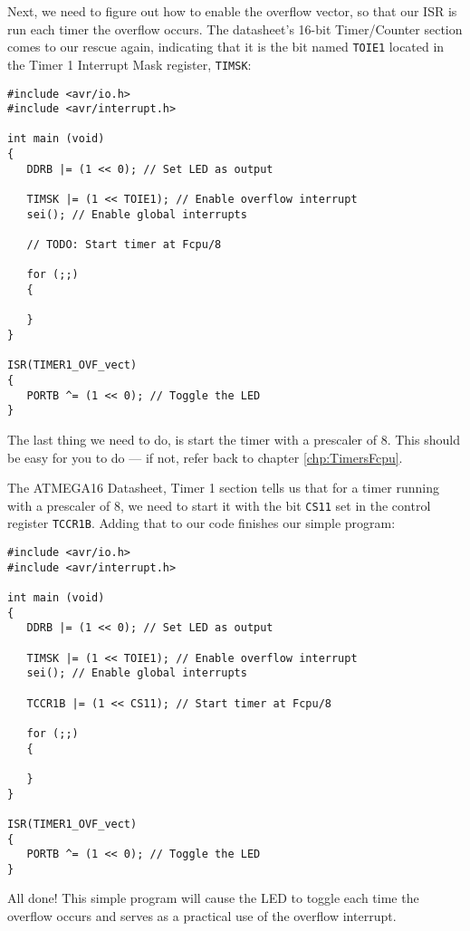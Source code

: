 \documentclass[a4paper,oneside]{book}
\begin{document}
Next, we need to figure out how to enable the overflow vector, so that our ISR is run each timer the overflow occurs. The datasheet's 16-bit Timer/Counter section comes to our rescue again, indicating that it is the bit named \texttt{TOIE1} located in the Timer 1 Interrupt Mask register, \texttt{TIMSK}:

\begin{center}
\begin{lstlisting}
#include <avr/io.h>
#include <avr/interrupt.h>

int main (void)
{
   DDRB |= (1 << 0); // Set LED as output

   TIMSK |= (1 << TOIE1); // Enable overflow interrupt
   sei(); // Enable global interrupts

   // TODO: Start timer at Fcpu/8

   for (;;)
   {

   }
}

ISR(TIMER1_OVF_vect)
{
   PORTB ^= (1 << 0); // Toggle the LED
}
\end{lstlisting}
\end{center}

The last thing we need to do, is start the timer with a prescaler of 8. This should be easy for you to do --- if not, refer back to chapter \ref{chp:TimersFcpu}.

The ATMEGA16 Datasheet, Timer 1 section tells us that for a timer running with a prescaler of 8, we need to start it with the bit \texttt{CS11} set in the control register \texttt{TCCR1B}. Adding that to our code finishes our simple program: 

\begin{center}
\begin{lstlisting}
#include <avr/io.h>
#include <avr/interrupt.h>

int main (void)
{
   DDRB |= (1 << 0); // Set LED as output

   TIMSK |= (1 << TOIE1); // Enable overflow interrupt
   sei(); // Enable global interrupts

   TCCR1B |= (1 << CS11); // Start timer at Fcpu/8

   for (;;)
   {

   }
}

ISR(TIMER1_OVF_vect)
{
   PORTB ^= (1 << 0); // Toggle the LED
}
\end{lstlisting}
\end{center}

All done! This simple program will cause the LED to toggle each time the overflow occurs and serves as a practical use of the overflow interrupt. 
\end{document}
